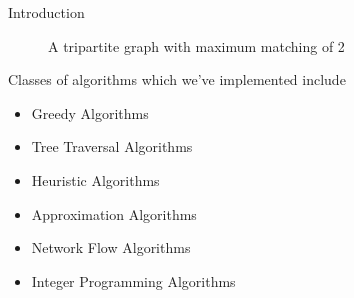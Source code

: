 \documentclass[final]{beamer}
\newlength{\sepwid}
\newlength{\onecolwid}
\begin{document}
\begin{columns}[t]
\begin{column}{\onecolwid}
\begin{block}{Introduction}
\begin{itemize}
\begin{figure}[ht]
            \caption{A tripartite graph with maximum matching of 2}
            \label{fig:tripartite_graph}
            \end{figure}
        \end{itemize}
        
        \noindent Classes of algorithms which we've implemented include

        \begin{itemize}
            \item Greedy Algorithms
            \item Tree Traversal Algorithms
            \item Heuristic Algorithms
            \item Approximation Algorithms
            \item Network Flow Algorithms
            \item Integer Programming Algorithms
        \end{itemize}
        



    \end{block}
      

      
    \end{column}
    

    
    \begin{column}{\onecolwid} 
      

      

\end{column}
\end{columns}
\end{document}
